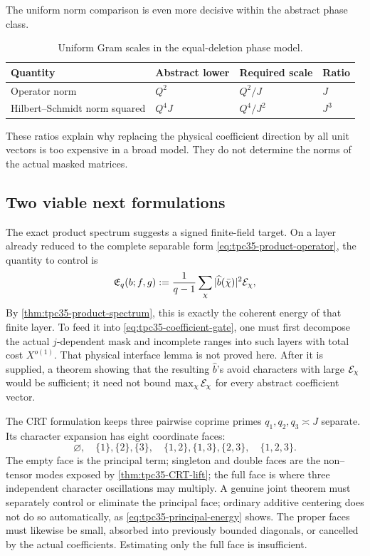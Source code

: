 The uniform norm comparison is even more decisive within the abstract
phase class.

\begin{table}[H]
\centering
\caption{Uniform Gram scales in the equal-deletion phase model.}
\label{tab:tpc35-uniform-ledger}
\small
\begin{tabular}{@{}llll@{}}
\toprule
Quantity & Abstract lower & Required scale & Ratio \\
\midrule
Operator norm & \(Q^2\) & \(Q^2/J\) & \(J\) \\
Hilbert--Schmidt norm squared & \(Q^4J\) & \(Q^4/J^2\) & \(J^3\) \\
\bottomrule
\end{tabular}
\end{table}

These ratios explain why replacing the physical coefficient direction by
all unit vectors is too expensive in a broad model.  They do not determine
the norms of the actual masked matrices.

\subsection{Two viable next formulations}

The exact product spectrum suggests a signed finite-field target.  On a
layer already reduced to the complete separable form
\eqref{eq:tpc35-product-operator}, the quantity to control is
\begin{equation}
 \mathfrak E_q(b;f,g)
 :=\frac1{q-1}\sum_\chi
 |\widehat b(\bar\chi)|^2\mathcal E_\chi,
 \label{eq:tpc35-signed-spectral-target}
\end{equation}
By \cref{thm:tpc35-product-spectrum}, this is exactly the coherent energy
of that finite layer.  To feed it into
\eqref{eq:tpc35-coefficient-gate}, one must first decompose the actual
\(j\)-dependent mask and incomplete ranges into such layers with total
cost \(X^{o(1)}\).  That physical interface lemma is not proved here.
After it is supplied, a theorem showing that the resulting
\(\widehat b\)'s avoid characters with large \(\mathcal E_\chi\) would be
sufficient; it need not bound \(\max_\chi\mathcal E_\chi\) for every abstract
coefficient vector.

The CRT formulation keeps three pairwise coprime primes
\(q_1,q_2,q_3\asymp J\) separate.  Its character expansion has eight
coordinate faces:
\begin{equation}
 \varnothing,\quad
 \{1\},\{2\},\{3\},\quad
 \{1,2\},\{1,3\},\{2,3\},\quad
 \{1,2,3\}.
 \label{eq:tpc35-three-coordinate-faces}
\end{equation}
The empty face is the principal term; singleton and double faces are the
non--tensor modes exposed by \cref{thm:tpc35-CRT-lift}; the full face is
where three independent character oscillations may multiply.  A genuine
joint theorem must separately control or eliminate the principal face;
ordinary additive centering does not do so automatically, as
\eqref{eq:tpc35-principal-energy} shows.  The proper faces must likewise
be small, absorbed into previously bounded diagonals, or cancelled by the
actual coefficients.  Estimating only the full face is insufficient.

